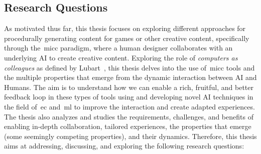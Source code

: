 

\subsection{Research Questions} \label{sec:RQS}

As motivated thus far, this thesis focuses on exploring different approaches for procedurally generating content for games or other creative content, specifically through the~\acrshort{micc} paradigm, where a human designer collaborates with an underlying AI to create creative content. Exploring the role of \emph{computers as colleagues} as defined by Lubart~\cite{lubart_how_2005}, this thesis delves into the use of~\acrshort{micc} tools and the multiple properties that emerge from the dynamic interaction between AI and Humans. The aim is to understand how we can enable a rich, fruitful, and better feedback loop in these types of tools using and developing novel AI techniques in the field of~\acrlong{ec} and~\acrlong{ml} to improve the interaction and create adapted experiences. The thesis also analyzes and studies the requirements, challenges, and benefits of enabling in-depth collaboration, tailored experiences, the properties that emerge (some seemingly competing properties), and their dynamics. Therefore, this thesis aims at addressing, discussing, and exploring the following research questions: 

